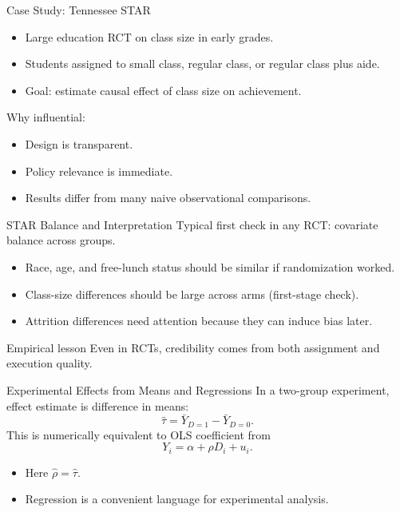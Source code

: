 \documentclass[11pt,aspectratio=169]{beamer}
\newcommand{\derivbutton}[1]{\vspace{0.4em}\hfill\hyperlink{app:#1}{\beamerbutton{Appendix details}}}
\begin{document}
\begin{frame}{Case Study: Tennessee STAR}
  \begin{itemize}
    \item Large education RCT on class size in early grades.
    \item Students assigned to small class, regular class, or regular class plus aide.
    \item Goal: estimate causal effect of class size on achievement.
  \end{itemize}
  Why influential:
  \begin{itemize}
    \item Design is transparent.
    \item Policy relevance is immediate.
    \item Results differ from many naive observational comparisons.
  \end{itemize}
\end{frame}

\begin{frame}{STAR Balance and Interpretation}
  Typical first check in any RCT: covariate balance across groups.
  \begin{itemize}
    \item Race, age, and free-lunch status should be similar if randomization worked.
    \item Class-size differences should be large across arms (first-stage check).
    \item Attrition differences need attention because they can induce bias later.
  \end{itemize}
  \begin{block}{Empirical lesson}
    Even in RCTs, credibility comes from both assignment and execution quality.
  \end{block}
\end{frame}

\begin{frame}{Experimental Effects from Means and Regressions}
  In a two-group experiment, effect estimate is difference in means:
  \[
  \hat\tau = \bar Y_{D=1}-\bar Y_{D=0}.
  \]
  This is numerically equivalent to OLS coefficient from
  \[
  Y_i = \alpha + \rho D_i + u_i.
  \]
  \begin{itemize}
    \item Here \(\hat\rho=\hat\tau\).
    \item Regression is a convenient language for experimental analysis.
  \end{itemize}
  \derivbutton{ols-dim}
\end{frame}
\end{document}
